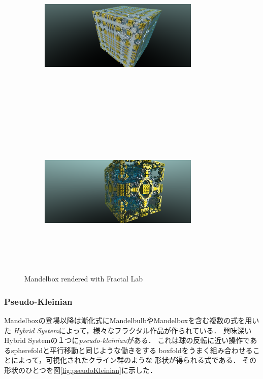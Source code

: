 \begin{figure}[h!tbp]
 \begin{subfigure}{0.49\hsize}
  \center
  \includegraphics[width=3in, height=3in, keepaspectratio]{../img/fractal/mandelbox.pdf}
  \caption{}
  \label{fig:mandelbox1}
 \end{subfigure}
 \hspace*{\fill}
 \begin{subfigure}{0.49\hsize}
  \center
  \includegraphics[width=3in, height=3in, keepaspectratio]{../img/fractal/mandelbox2.pdf}
  \caption{}
  \label{fig:mandelbox2}
 \end{subfigure}
 \caption{Mandelbox rendered with Fractal Lab}
 \label{fig:mandelbox}
\end{figure}


\subsubsection{Pseudo-Kleinian}

Mandelboxの登場以降は漸化式にMandelbulbやMandelboxを含む複数の式を用いた
\textit{Hybrid System}によって，様々なフラクタル作品が作られている．
興味深いHybrid Systemの１つに\textit{pseudo-kleinian}がある．
これは球の反転に近い操作であるspherefoldと平行移動と同じような働きをする
boxfoldをうまく組み合わせることによって，可視化されたクライン群のような
形状が得られる式である．
その形状のひとつを図\ref{fig:pseudoKleinian}に示した．

